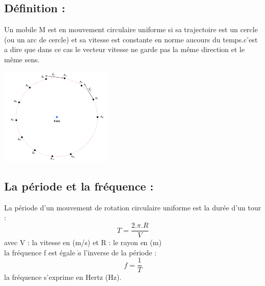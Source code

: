 \documentclass[12pt]{article}
\begin{document}
\subsection{Définition :}
Un mobile M est en mouvement circulaire uniforme si sa trajectoire est un cercle (ou un arc de cercle) et sa vitesse est constante en norme aucours du temps.c'est a dire que dans ce cas le vecteur vitesse ne garde pas la même direction et le même sens.
\begin{center}
\includegraphics[width=0.4\textwidth]{./img/img10.png}
\end{center}

\subsection{La période et la fréquence : }
La période d'un mouvement de rotation circulaire uniforme est la durée d'un tour : $$T = \frac{2.\pi.R}{V}$$ avec V : la vitesse en (m/s) et R : le rayon en (m)
\\la fréquence f est égale $\grave{a}$ l'inverse de la période : $$f = \frac{1}{T}$$
la fréquence s'exprime en Hertz (Hz).
\end{document}
